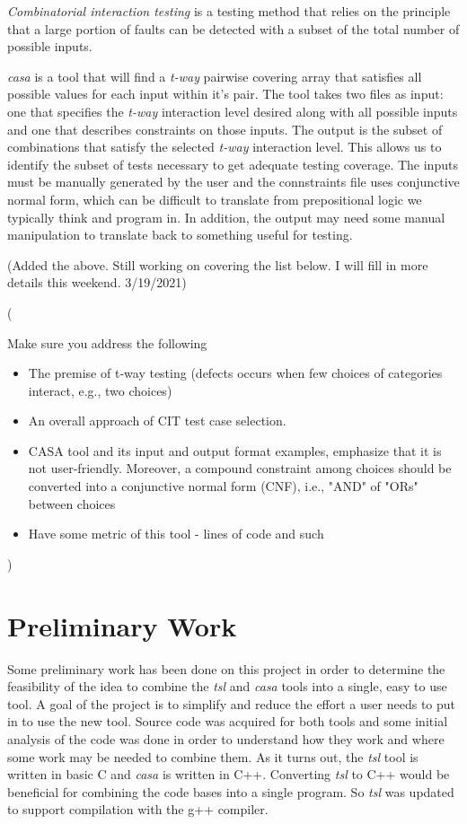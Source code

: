 \documentclass[a4full,12pt]{article}
\newcommand{\eas}[1]{{\color{blue}\sf ({#1})}}
\newcommand{\ag}[1]{{\color{red}\sf ({#1})}}
\begin{document}
\emph{Combinatorial interaction testing} is a testing method that relies on the principle
  that a large portion of faults can be detected with a subset of the total number of 
  possible inputs. 
  
\emph{casa} is a tool that will find a \emph{t-way} pairwise covering 
  array that satisfies all possible values for each input within it's pair. The tool takes
  two files as input: one that specifies the \emph{t-way} interaction level desired along
  with all possible inputs and one that describes constraints on those inputs. The output
  is the subset of combinations that satisfy the selected \emph{t-way} interaction level.
  This allows us to identify the subset of tests necessary to get adequate testing coverage.
  The inputs must be manually generated by the user and the connstraints file uses conjunctive
  normal form, which can be difficult to translate from prepositional logic we typically
  think and program in. In addition, the output may need some manual manipulation to translate
  back to something useful for testing.
  

\ag{Added the above. Still working on covering the list below. I will fill in more details this weekend. 3/19/2021} 
\eas{Make sure you address the following
\begin{itemize}
\item The premise of t-way testing (defects occurs when few choices of categories interact, e.g., two choices)
\item An overall approach of CIT test case selection.
\item CASA tool and its input and output format examples, emphasize that it is not user-friendly. Moreover, a compound constraint among choices should be converted into a conjunctive normal form (CNF), i.e., "AND" of "ORs" between choices
\item Have some metric of this tool - lines of code and such
\end{itemize}
}

\section{Preliminary Work}
Some preliminary work has been done on this project in order to determine the
  feasibility of the idea to combine the \emph{tsl} and \emph{casa} tools into 
  a single, easy to use tool. A goal of the project is to simplify and reduce the
  effort a user needs to put in to use the new tool. Source code was acquired for
  both tools and some initial analysis of the code was done in order to understand
  how they work and where some work may be needed to combine them. As it
  turns out, the \emph{tsl} tool is written in basic C and \emph{casa} is written
  in C++. Converting \emph{tsl} to C++ would be beneficial for combining the 
  code bases into a single program. So \emph{tsl} was updated to support compilation
  with the g++ compiler.
\end{document}
